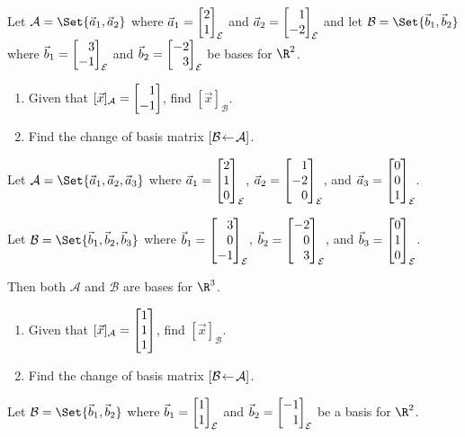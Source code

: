\begin{exercises}
	\begin{problist}
		\prob Let $\mathcal A=\Set{\vec a_1,\vec a_2}$ where $\vec a_1=\mat{2\\1}_{\mathcal E}$ and $\vec a_2=\mat{1\\-2}_{\mathcal E}$ and let $\mathcal B=\Set{\vec b_1,\vec b_2}$ where $\vec b_1=\mat{3\\-1}_{\mathcal E}$ and $\vec b_2=\mat{-2\\3}_{\mathcal E}$ be bases for $\R^2$. 
	    \begin{enumerate}
	        \item Given that $[\vec x]_{\mathcal A}=\mat{1\\-1}$, find $[\vec x]_{\mathcal B}$.
	        \item Find the change of basis matrix $\BasisChange{\mathcal A}{\mathcal B}$.
	    \end{enumerate}
	    
	    \prob Let $\mathcal A=\Set{\vec a_1,\vec a_2,\vec a_3}$ where $\vec a_1=\mat{2\\1\\0}_{\mathcal E}$, $\vec a_2=\mat{1\\-2\\0}_{\mathcal E}$, and $\vec a_3=\mat{0\\0\\1}_{\mathcal E}$.
	    
	    Let $\mathcal B=\Set{\vec b_1,\vec b_2,\vec b_3}$ where $\vec b_1=\mat{3\\0\\-1}_{\mathcal E}$, $\vec b_2=\mat{-2\\0\\3}_{\mathcal E}$, and $\vec b_3=\mat{0\\1\\0}_{\mathcal E}$.
	    
	    Then  both $\mathcal A$ and $\mathcal B$ are bases for $\R^3$. 
	    \begin{enumerate}
	        \item Given that $[\vec x]_{\mathcal A}=\mat{1\\1\\1}$, find $[\vec x]_{\mathcal B}$.
	        \item Find the change of basis matrix $\BasisChange{\mathcal A}{\mathcal B}$.
	    \end{enumerate}
	    
	    \prob Let $\mathcal B=\Set{\vec b_1,\vec b_2}$ where $\vec b_1=\mat{1\\1}_{\mathcal E}$ and $\vec b_2=\mat{-1\\1}_{\mathcal E}$ be a basis for $\R^2$.
	    

\end{problist}
\end{exercises}
